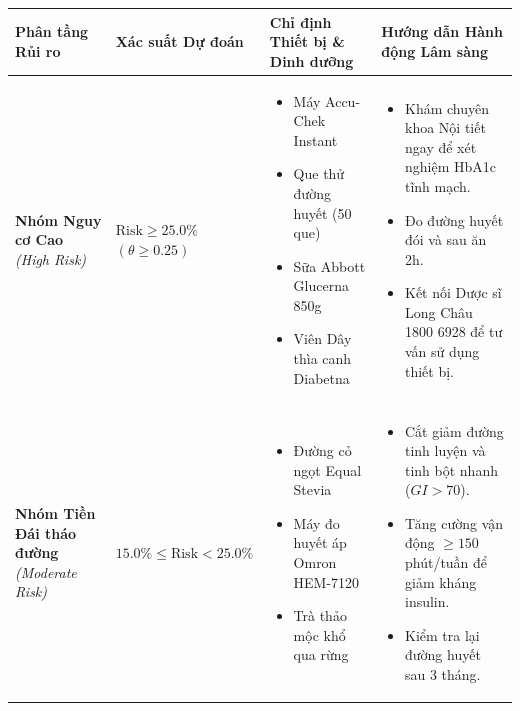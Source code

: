 \documentclass[12pt,a4paper]{report}
\begin{document}
\begin{table}[H]
\centering
\small
\begin{tabular}{p{2.6cm}p{2.3cm}p{4.3cm}p{4.3cm}}
\toprule
\textbf{Phân tầng Rủi ro} & \textbf{Xác suất Dự đoán} & \textbf{Chỉ định Thiết bị \& Dinh dưỡng} & \textbf{Hướng dẫn Hành động Lâm sàng} \\
\midrule
\textbf{Nhóm Nguy cơ Cao} \newline \textit{(High Risk)} & $\text{Risk} \ge \mathbf{25.0\%}$ \newline $(\theta \ge 0.25)$ & 
\begin{itemize}[leftmargin=1.0em, topsep=0pt, partopsep=0pt, parsep=0pt, itemsep=1pt]
    \item Máy Accu-Chek Instant
    \item Que thử đường huyết (50 que)
    \item Sữa Abbott Glucerna 850g
    \item Viên Dây thìa canh Diabetna
\end{itemize} & 
\begin{itemize}[leftmargin=1.0em, topsep=0pt, partopsep=0pt, parsep=0pt, itemsep=1pt]
    \item Khám chuyên khoa Nội tiết ngay để xét nghiệm HbA1c tĩnh mạch.
    \item Đo đường huyết đói và sau ăn 2h.
    \item Kết nối Dược sĩ Long Châu 1800 6928 để tư vấn sử dụng thiết bị.
\end{itemize} \\
\midrule
\textbf{Nhóm Tiền Đái tháo đường} \newline \textit{(Moderate Risk)} & $15.0\% \le \text{Risk} < 25.0\%$ & 
\begin{itemize}[leftmargin=1.0em, topsep=0pt, partopsep=0pt, parsep=0pt, itemsep=1pt]
    \item Đường cỏ ngọt Equal Stevia
    \item Máy đo huyết áp Omron HEM-7120
    \item Trà thảo mộc khổ qua rừng
\end{itemize} & 
\begin{itemize}[leftmargin=1.0em, topsep=0pt, partopsep=0pt, parsep=0pt, itemsep=1pt]
    \item Cắt giảm đường tinh luyện và tinh bột nhanh ($GI > 70$).
    \item Tăng cường vận động $\ge 150$ phút/tuần để giảm kháng insulin.
    \item Kiểm tra lại đường huyết sau 3 tháng.
\end{itemize} \\

\end{tabular}
\end{table}
\end{document}
